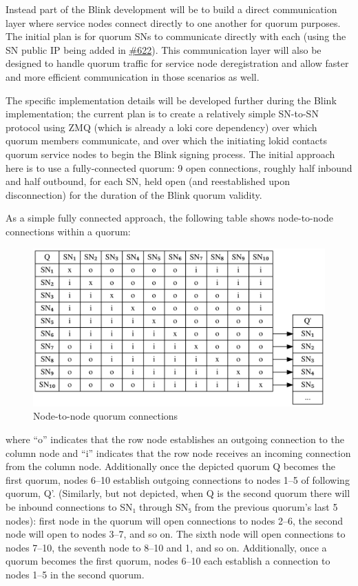 Instead part of the Blink development will be to build a direct
communication layer where service nodes connect directly to one another
for quorum purposes. The initial plan is for quorum SNs to communicate
directly with each (using the SN public IP being added in
\href{https://github.com/loki-project/loki/pull/622}{\#622}). This
communication layer will also be designed to handle quorum traffic for
service node deregistration and allow faster and more efficient
communication in those scenarios as well.

The specific implementation details will be developed further during the
Blink implementation; the current plan is to create a relatively simple
SN-to-SN protocol using ZMQ (which is already a loki core dependency)
over which quorum members communicate, and over which the initiating
lokid contacts quorum service nodes to begin the Blink signing process.
The initial approach here is to use a fully-connected quorum: 9 open
connections, roughly half inbound and half outbound, for each SN, held
open (and reestablished upon disconnection) for the duration of the
Blink quorum validity.

As a simple fully connected approach, the following table shows
node-to-node connections within a quorum:

\begin{figure}
\centering
\includegraphics{blink-quorum-conns.svg}
\caption{Node-to-node quorum connections}
\end{figure}

where ``o'' indicates that the row node establishes an outgoing
connection to the column node and ``i'' indicates that the row node
receives an incoming connection from the column node. Additionally once
the depicted quorum Q becomes the first quorum, nodes 6--10 establish
outgoing connections to nodes 1--5 of following quorum, Q'. (Similarly,
but not depicted, when Q is the second quorum there will be inbound
connections to SN₁ through SN₅ from the previous quorum's last 5 nodes):
first node in the quorum will open connections to nodes 2--6, the second
node will open to nodes 3--7, and so on. The sixth node will open
connections to nodes 7--10, the seventh node to 8--10 and 1, and so on.
Additionally, once a quorum becomes the first quorum, nodes 6--10 each
establish a connection to nodes 1--5 in the second quorum.


